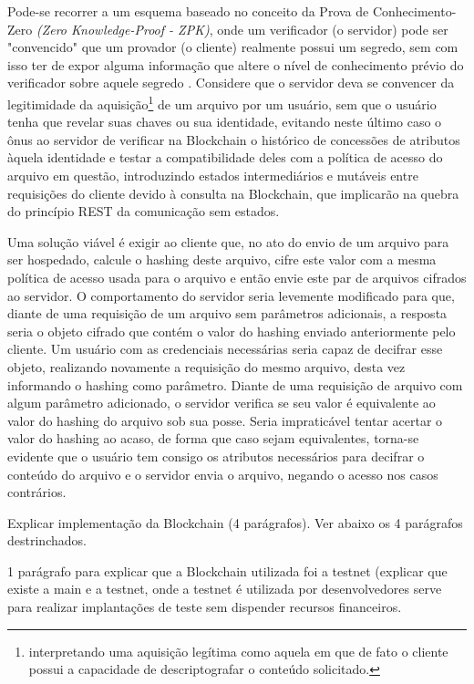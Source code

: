 \documentclass[a4paper,11pt]{article}
\begin{document}
Pode-se recorrer a um esquema baseado no conceito da Prova de Conhecimento-Zero \emph{(Zero Knowledge-Proof - ZPK)}, onde um verificador (o servidor) pode ser "convencido" que um provador (o cliente) realmente possui um segredo, sem com isso ter de expor alguma informação que altere o nível de conhecimento prévio do verificador sobre aquele segredo \cite{Rice2010,Buchanan2017}.
Considere que o servidor deva se convencer da legitimidade da aquisição\footnote{interpretando uma aquisição legítima como aquela em que de fato o cliente possui a capacidade de descriptografar o conteúdo solicitado.} de um arquivo por um usuário, sem que o usuário tenha que revelar suas chaves ou sua identidade, evitando neste último caso o ônus ao servidor de verificar na Blockchain o histórico de concessões de atributos àquela identidade e testar a compatibilidade deles com a política de acesso do arquivo em questão, introduzindo estados intermediários e mutáveis entre requisições do cliente devido à consulta na Blockchain, que implicarão na quebra do princípio REST da comunicação sem estados.

Uma solução viável é exigir ao cliente que, no ato do envio de um arquivo para ser hospedado, calcule o hashing deste arquivo, cifre este valor com a mesma política de acesso usada para o arquivo e então envie este par de arquivos cifrados ao servidor.
O comportamento do servidor seria levemente modificado para que, diante de uma requisição de um arquivo sem parâmetros adicionais, a resposta seria o objeto cifrado que contém o valor do hashing enviado anteriormente pelo cliente.
Um usuário com as credenciais necessárias seria capaz de decifrar esse objeto, realizando novamente a requisição do mesmo arquivo, desta vez informando o hashing como parâmetro.
Diante de uma requisição de arquivo com algum parâmetro adicionado, o servidor verifica se seu valor é equivalente ao valor do hashing do arquivo sob sua posse.
Seria impraticável tentar acertar o valor do hashing ao acaso, de forma que caso sejam equivalentes, torna-se evidente que o usuário tem consigo os atributos necessários para decifrar o conteúdo do arquivo e o servidor envia o arquivo, negando o acesso nos casos contrários.

{\color{ForestGreen} Explicar implementação da Blockchain (4 parágrafos). Ver abaixo os 4 parágrafos destrinchados. }

{\color{Magenta} 1 parágrafo para explicar que a Blockchain utilizada foi a testnet (explicar que existe a main e a testnet, onde a testnet é utilizada por desenvolvedores serve para realizar implantações de teste sem dispender recursos financeiros.}
\end{document}

